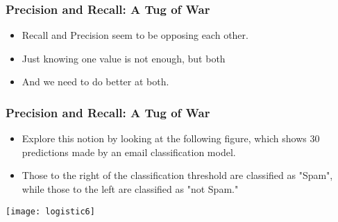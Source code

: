 




\begin{frame}[fragile]\frametitle{Precision and Recall: A Tug of War}
\begin{itemize}
\item Recall and Precision seem to be opposing each other.
\item Just knowing one value is not enough, but both
\item And we need to do better at both.

\end{itemize}

\end{frame}

\begin{frame}[fragile]\frametitle{Precision and Recall: A Tug of War}
\begin{itemize}
\item Explore this notion by looking at the following figure, which shows 30 predictions made by an email classification model. 
\item Those to the right of the classification threshold are classified as "Spam", while those to the left are classified as "not Spam."
\end{itemize}

\begin{center}
\texttt{[image: logistic6]}
\end{center}

\end{frame}


